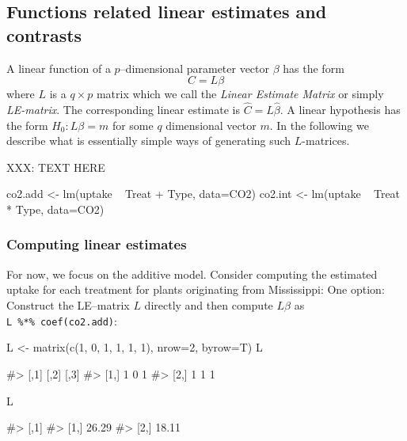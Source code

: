 \hypertarget{functions-related-linear-estimates-and-contrasts}{%
\subsection{Functions related linear estimates and
contrasts}\label{functions-related-linear-estimates-and-contrasts}}

A linear function of a \(p\)--dimensional parameter vector \(\beta\) has
the form \begin{displaymath}
  C=L\beta
\end{displaymath} where \(L\) is a \(q\times p\) matrix which we call
the \emph{Linear Estimate Matrix} or simply \emph{LE-matrix}. The
corresponding linear estimate is \(\hat C = L \hat \beta\). A linear
hypothesis has the form \(H_0: L\beta=m\) for some \(q\) dimensional
vector \(m\). In the following we describe what is essentially simple
ways of generating such \(L\)-matrices.

XXX: TEXT HERE

\begin{Schunk}
\begin{Sinput}
co2.add <- lm(uptake ~ Treat + Type, data=CO2)
co2.int <- lm(uptake ~ Treat * Type, data=CO2)
\end{Sinput}
\end{Schunk}

\hypertarget{computing-linear-estimates}{%
\subsubsection{Computing linear
estimates}\label{computing-linear-estimates}}

For now, we focus on the additive model. Consider computing the
estimated uptake for each treatment for plants originating from
Mississippi: One option: Construct the LE--matrix \(L\) directly and
then compute \(L\hat\beta\) as \texttt{L\ \%*\%\ coef(co2.add)}:

\begin{Schunk}
\begin{Sinput}
L <- matrix(c(1, 0, 1, 
              1, 1, 1), nrow=2, byrow=T)
L
\end{Sinput}
\begin{Soutput}
#>      [,1] [,2] [,3]
#> [1,]    1    0    1
#> [2,]    1    1    1
\end{Soutput}
\begin{Sinput}
L %
\end{Sinput}
\begin{Soutput}
#>       [,1]
#> [1,] 26.29
#> [2,] 18.11
\end{Soutput}
\end{Schunk}

